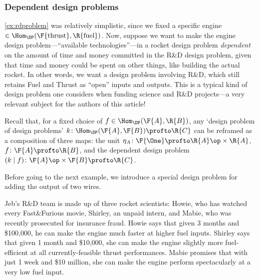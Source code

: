 \subsubsection{Dependent design problems}
\cref{ex:rdproblem} was relatively simplistic, since we fixed a specific engine $\in \Hom_\DP(\F{\text{thrust}}, \R{\text{fuel}})$. Now, suppose we want to make the engine design problem---``available technologies''---in a rocket design problem \emph{dependent} on the amount of time and money committed in the R\&D design problem, given that time and money could be spent on other things, like building the actual rocket. In other words, we want a design problem involving R\&D, which still retains Fuel and Thrust as ``open'' inputs and outputs. This is a typical kind of design problem one considers when funding science and R\&D projects---a very relevant subject for the authors of this article!

Recall that, for a fixed choice of $f \in \Hom_\DP(\F{A},\R{B})$, any `design problem of design problems' $k \colon \Hom_\DP(\F{A},\F{B}) \profto \R{C}$ can be reframed as a composition of three maps: the unit $\eta_A \colon \F{\One} \profto \R{A}\op \times \R{A}$, $f \colon \F{A} \profto \R{B}$, and the dependent design problem $(k \mid f) \colon \F{A}\op \times \F{B} \profto \R{C}$.


Before going to the next example, we introduce a special design problem for adding the output of two wires.


\begin{example}
  Jeb's R\&D team is made up of three rocket scientists: Howie, who has watched every Fast\&Furious movie, Shirley, an unpaid intern, and Mabie, who was recently prosecuted for insurance fraud. Howie says that given 3 months and \$100,000, he can make the engine much faster at higher fuel inputs. Shirley says that given 1 month and \$10,000, she can make the engine slightly more fuel-efficient at all currently-feasible thrust performances. Mabie promises that with just 1 week and \$10 million, she can make the engine perform spectacularly at a very low fuel input.
\end{example}

